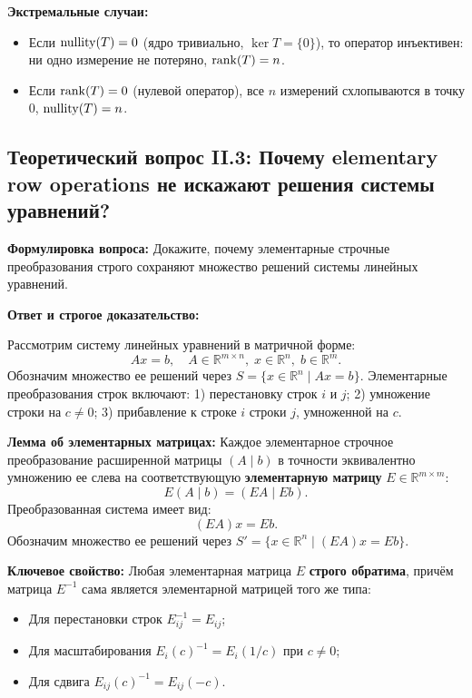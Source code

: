 \textbf{Экстремальные случаи:}
\begin{itemize}
    \item Если $\operatorname{nullity}(T) = 0$ (ядро тривиально, $\ker T = \{0\}$), то оператор инъективен: ни одно измерение
    не потеряно, $\operatorname{rank}(T) = n$.
    \item Если $\operatorname{rank}(T) = 0$ (нулевой оператор), все $n$ измерений схлопываются в точку $0$, $\operatorname{nullity}(T) = n$.
\end{itemize}


\subsection{Теоретический вопрос II.3: Почему elementary row operations не искажают решения системы уравнений?}
\textbf{Формулировка вопроса:} Докажите, почему элементарные строчные преобразования строго сохраняют множество решений
системы линейных уравнений.

\textbf{Ответ и строгое доказательство:}

Рассмотрим систему линейных уравнений в матричной форме:
\[ Ax = b, \quad A \in \mathbb{R}^{m \times n}, \; x \in \mathbb{R}^n, \; b \in \mathbb{R}^m. \]
Обозначим множество ее решений через $S = \{ x \in \mathbb{R}^n \mid Ax = b \}$.
Элементарные преобразования строк включают: 1) перестановку строк $i$ и $j$; 2) умножение строки на $c \ne 0$; 3)
прибавление к строке $i$ строки $j$, умноженной на $c$.

\textbf{Лемма об элементарных матрицах:} Каждое элементарное строчное преобразование расширенной матрицы $(A \mid b)$ в
точности эквивалентно умножению ее слева на соответствующую \textbf{элементарную матрицу} $E \in \mathbb{R}^{m \times
m}$:
\[ E (A \mid b) = (EA \mid Eb). \]
Преобразованная система имеет вид:
\[ (EA) x = Eb. \]
Обозначим множество ее решений через $S' = \{ x \in \mathbb{R}^n \mid (EA)x = Eb \}$.

\textbf{Ключевое свойство:} Любая элементарная матрица $E$ \textbf{строго обратима}, причём матрица $E^{-1}$ сама
является элементарной матрицей того же типа:
\begin{itemize}
    \item Для перестановки строк $E_{ij}^{-1} = E_{ij}$;
    \item Для масштабирования $E_i(c)^{-1} = E_i(1/c)$ при $c \ne 0$;
    \item Для сдвига $E_{ij}(c)^{-1} = E_{ij}(-c)$.
\end{itemize}

